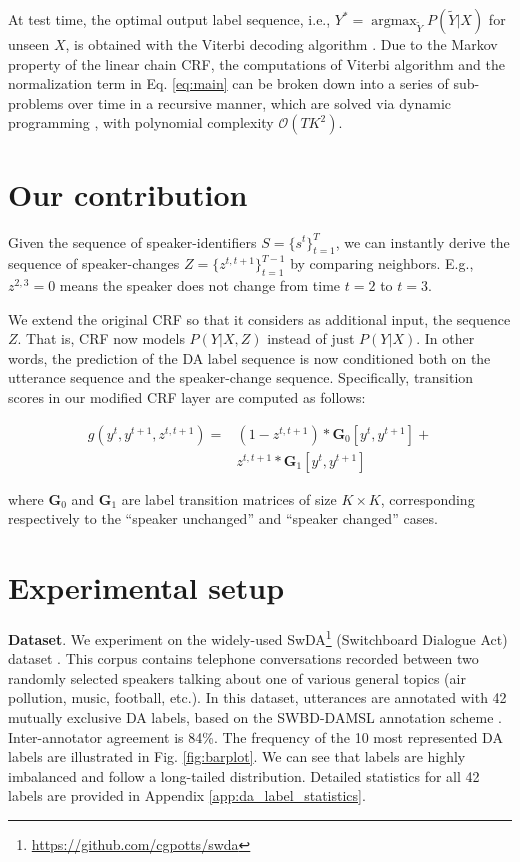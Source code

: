 \documentclass[11pt,a4paper]{article}
\begin{document}
\noindent At test time, the optimal output label sequence, i.e., $Y^* = \operatorname*{argmax}_{\tilde{Y}} P(\tilde{Y}|X)$ for unseen $X$, is obtained with the Viterbi decoding algorithm \citep{viterbi1967error}.
Due to the Markov property of the linear chain CRF, the computations of Viterbi algorithm and the normalization term in Eq. \ref{eq:main} can be broken down into a series of sub-problems over time in a recursive manner, which are solved via dynamic programming \citep{bellman1966dynamic}, with polynomial complexity $\mathcal{O}(TK^2)$.

\section{Our contribution}
Given the sequence of speaker-identifiers $S=\{s^t\}_{t=1}^{T}$, we can instantly derive the sequence of speaker-changes $Z=\{z^{t, t+1}\}_{t=1}^{T-1}$ by comparing neighbors. E.g., $z^{2,3}=0$ means the speaker does not change from time $t=2$ to $t=3$. 

We extend the original CRF so that it considers as additional input, the sequence $Z$.
That is, CRF now models $P(Y|X,Z)$ instead of just $P(Y|X)$.
In other words, the prediction of the DA label sequence is now conditioned both on the utterance sequence and the speaker-change sequence.
Specifically, transition scores in our modified CRF layer are computed as follows:

{\small
\setlength{\abovedisplayskip}{-3pt}
\setlength{\belowdisplayskip}{3pt}
\begin{align}
    g(y^t,y^{t+1},z^{t,t+1}) =  &(1-z^{t,t+1})*\mathbf{G}_0[y^t,y^{t+1}] + \nonumber \\
    &z^{t,t+1}*\mathbf{G}_1[y^t,y^{t+1}]
\end{align}
}

\noindent where $\mathbf{G}_0$ and $\mathbf{G}_1$ are label transition matrices of size $K \times K$, corresponding respectively to the ``speaker unchanged'' and ``speaker changed'' cases.

\section{Experimental setup}

\noindent \textbf{Dataset}.
We experiment on the widely-used SwDA\footnote{\url{https://github.com/cgpotts/swda}} (Switchboard Dialogue Act) dataset \citep{jurafsky1997switchboard,stolcke-etal-2000-dialogue}.
This corpus contains telephone conversations recorded between two randomly selected speakers talking about one of various general topics (air pollution, music, football, etc.).
In this dataset, utterances are annotated with 42 mutually exclusive DA labels, based on the SWBD-DAMSL annotation scheme \citep{jurafsky1997switchboard}.
Inter-annotator agreement is 84\%.
The frequency of the 10 most represented DA labels are illustrated in Fig. \ref{fig:barplot}. 
We can see that labels are highly imbalanced and follow a long-tailed distribution.
Detailed statistics for all 42 labels are provided in Appendix \ref{app:da_label_statistics}.
\end{document}
